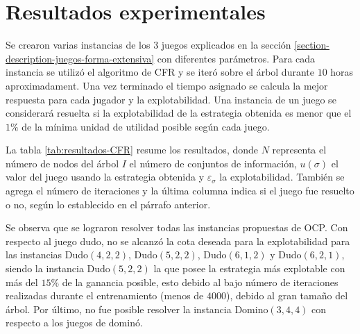 \section{Resultados experimentales}

Se crearon varias instancias de los $3$ juegos explicados en la sección \ref{section-description-juegos-forma-extensiva} con diferentes parámetros. Para cada instancia se utilizó el algoritmo de CFR y se iteró sobre el árbol durante $10$ horas aproximadament. Una vez terminado el tiempo asignado se calcula la mejor respuesta para cada jugador y la explotabilidad. Una instancia de un juego se considerará resuelta si la explotabilidad de la estrategia obtenida es menor que el $1\%$ de la mínima unidad de utilidad posible según cada juego.

La tabla \ref{tab:resultados-CFR} resume los resultados, donde $N$ representa el número de nodos del árbol $I$ el número de conjuntos de información, $u({\sigma})$ el valor del juego usando la estrategia obtenida y $\varepsilon_{\sigma}$ la explotabilidad. También se agrega el número de iteraciones y la última columna indica si el juego fue resuelto o no, según lo establecido en el párrafo anterior.

Se observa que se lograron resolver todas las instancias propuestas de OCP. Con respecto al juego dudo, no se alcanzó la cota deseada para la explotabilidad para las instancias Dudo$(4, 2, 2)$, Dudo$(5, 2, 2)$, Dudo$(6, 1, 2)$ y Dudo$(6, 2, 1)$, siendo la instancia Dudo$(5, 2, 2)$ la que posee la estrategia más explotable con más del $15\%$ de la ganancia posible, esto debido al bajo número de iteraciones realizadas durante el entrenamiento (menos de $4000$), debido al gran tamaño del árbol. Por último, no fue posible resolver la instancia Domino$(3, 4, 4)$ con respecto a los juegos de dominó.

